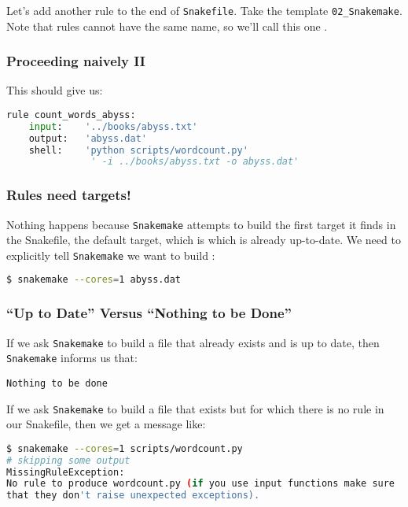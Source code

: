 \begin{frame}[fragile]
  \frametitle{}
  Let’s add another rule to the end of \texttt{Snakefile}. Take the template \texttt{02\_Snakemake}. Note that rules cannot have the same name, so we’ll call this one .
\end{frame}

\begin{frame}[fragile]
   \frametitle{Proceeding naively II}
   This should give us:
  \begin{lstlisting}[language=Python,style=Python]
rule count_words_abyss:
    input:    '../books/abyss.txt'
    output:   'abyss.dat'
    shell:    'python scripts/wordcount.py' 
               ' -i ../books/abyss.txt -o abyss.dat'
  \end{lstlisting}
\end{frame}

\begin{frame}[fragile]
  \frametitle{Rules need targets!}
  Nothing happens because \texttt{Snakemake} attempts to build the first target it finds in the Snakefile, the default target, which is  which is already up-to-date. We need to explicitly tell \texttt{Snakemake} we want to build :
  \begin{lstlisting}[language=Bash, style=Shell]
$ snakemake --cores=1 abyss.dat
  \end{lstlisting}
\end{frame}

\begin{frame}[fragile]
  \frametitle{``Up to Date'' Versus ``Nothing to be Done''}
  If we ask \texttt{Snakemake} to build a file that already exists and is up to date, then \texttt{Snakemake} informs us that:
  \begin{lstlisting}[style=Plain]
Nothing to be done
  \end{lstlisting}
  \pause
  If we ask \texttt{Snakemake} to build a file that exists but for which there is no rule in our Snakefile, then we get a message like:
  \begin{lstlisting}[language=Bash, style=Shell, basicstyle=\footnotesize]
$ snakemake --cores=1 scripts/wordcount.py
# skipping some output
MissingRuleException:
No rule to produce wordcount.py (if you use input functions make sure
that they don't raise unexpected exceptions).
  \end{lstlisting}
\end{frame}

